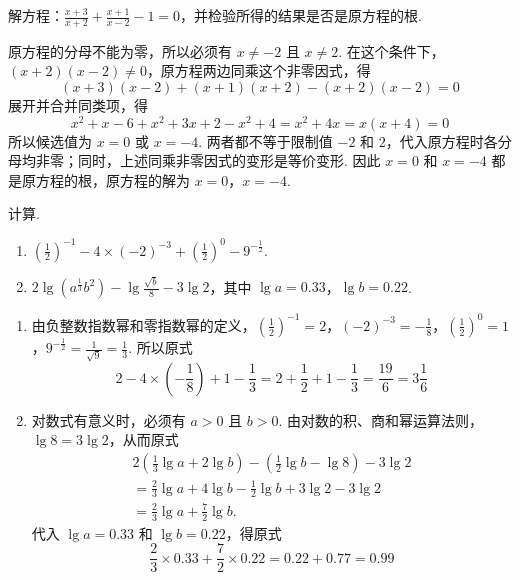 \begin{problem}
解方程：\(\frac{x+3}{x+2}+\frac{x+1}{x-2}-1=0\)，并检验所得的结果是否是原方程的根.
\end{problem}

\begin{solution}
原方程的分母不能为零，所以必须有 \(x\ne-2\) 且 \(x\ne2\). 在这个条件下，\(\left(x+2\right)\left(x-2\right)\ne0\)，原方程两边同乘这个非零因式，得
\[
\left(x+3\right)\left(x-2\right)+\left(x+1\right)\left(x+2\right)-\left(x+2\right)\left(x-2\right)=0
\]
展开并合并同类项，得
\[
x^2+x-6+x^2+3x+2-x^2+4=x^2+4x=x\left(x+4\right)=0
\]
所以候选值为 \(x=0\) 或 \(x=-4\). 两者都不等于限制值 \(-2\) 和 \(2\)，代入原方程时各分母均非零；同时，上述同乘非零因式的变形是等价变形. 因此 \(x=0\) 和 \(x=-4\) 都是原方程的根，原方程的解为 \(x=0\)，\(x=-4\).
\end{solution}

\begin{problem}
计算.
\begin{enumerate}
    \item
    \(\left(\frac{1}{2}\right)^{-1}-4\times\left(-2\right)^{-3}+\left(\frac{1}{2}\right)^0-9^{-\frac{1}{2}}\).
    \item
    \(2\lg\left(a^{\frac{1}{3}}b^2\right)-\lg\frac{\sqrt{b}}{8}-3\lg2\)，其中 \(\lg a=0.33\)，\(\lg b=0.22\).
\end{enumerate}
\end{problem}

\begin{solution}
\begin{enumerate}
\item 由负整数指数幂和零指数幂的定义，\(\left(\frac{1}{2}\right)^{-1}=2\)，\(\left(-2\right)^{-3}=-\frac{1}{8}\)，\(\left(\frac{1}{2}\right)^0=1\)，\(9^{-\frac{1}{2}}=\frac{1}{\sqrt{9}}=\frac{1}{3}\). 所以原式
\[
2-4\times\left(-\frac{1}{8}\right)+1-\frac{1}{3}=2+\frac{1}{2}+1-\frac{1}{3}=\frac{19}{6}=3\frac{1}{6}
\]

\item 对数式有意义时，必须有 \(a>0\) 且 \(b>0\). 由对数的积、商和幂运算法则，\(\lg8=3\lg2\)，从而原式
\[
\begin{gathered}
2\left(\frac{1}{3}\lg a+2\lg b\right)-\left(\frac{1}{2}\lg b-\lg8\right)-3\lg2 \\
=\frac{2}{3}\lg a+4\lg b-\frac{1}{2}\lg b+3\lg2-3\lg2 \\
=\frac{2}{3}\lg a+\frac{7}{2}\lg b.
\end{gathered}
\]
代入 \(\lg a=0.33\) 和 \(\lg b=0.22\)，得原式
\[
\frac{2}{3}\times0.33+\frac{7}{2}\times0.22=0.22+0.77=0.99
\]
\end{enumerate}
\end{solution}

